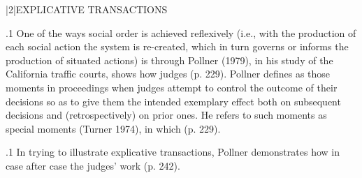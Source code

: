 \documentclass[11pt, twoside]{article}
\begin{document}
{\s|2|{EXPLICATIVE TRANSACTIONS}

\p.1{%
One of the ways social order is achieved reflexively (i.e., with the
production of each social action the system is re-created, which in turn
governs or informs the production of situated actions) is through  Pollner (1979), in his study of the California
traffic courts, shows how judges  (p. 229). Pollner defines  as
those moments in proceedings when judges attempt to control the outcome of their decisions so as to give them the intended exemplary effect
both on subsequent decisions and (retrospectively) on prior ones. He
refers to such moments as special  moments (Turner 1974), in
which  (p. 229).
}%

\p.1{%
In trying to illustrate explicative transactions, Pollner demonstrates
how in case after case the judges’ work  (p. 242).
}%

}
\end{document}

